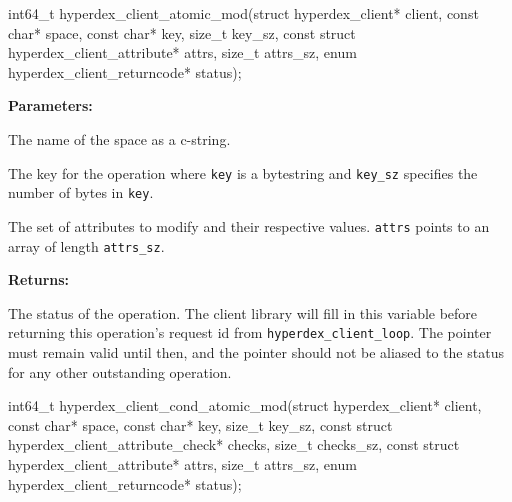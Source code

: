 \funcsep
{}
\begin{ccode}
int64_t hyperdex_client_atomic_mod(struct hyperdex_client* client,
                const char* space,
                const char* key, size_t key_sz,
                const struct hyperdex_client_attribute* attrs, size_t attrs_sz,
                enum hyperdex_client_returncode* status);
\end{ccode}
\funcdesc 

\noindent\textbf{Parameters:}
\begin{description}[labelindent=\widthof{{\texttt{attrs}, \texttt{attrs\_sz}}},leftmargin=*,noitemsep,nolistsep,align=right]
\item[\texttt{space}] The name of the space as a c-string.
\item[\texttt{key}, \texttt{key\_sz}] The key for the operation where \texttt{key} is a bytestring and \texttt{key\_sz} specifies the number of bytes in \texttt{key}.
\item[\texttt{attrs}, \texttt{attrs\_sz}] The set of attributes to modify and their respective values.  \texttt{attrs} points to an array of length \texttt{attrs\_sz}.
\end{description}

\noindent\textbf{Returns:}
\begin{description}[labelindent=\widthof{{\texttt{status}}},leftmargin=*,noitemsep,nolistsep,align=right]
\item[\texttt{status}] The status of the operation.  The client library will fill in this variable before returning this operation's request id from \texttt{hyperdex\_client\_loop}.  The pointer must remain valid until then, and the pointer should not be aliased to the status for any other outstanding operation.
\end{description}

\funcsep
{}
\begin{ccode}
int64_t hyperdex_client_cond_atomic_mod(struct hyperdex_client* client,
                const char* space,
                const char* key, size_t key_sz,
                const struct hyperdex_client_attribute_check* checks, size_t checks_sz,
                const struct hyperdex_client_attribute* attrs, size_t attrs_sz,
                enum hyperdex_client_returncode* status);
\end{ccode}
\funcdesc 

